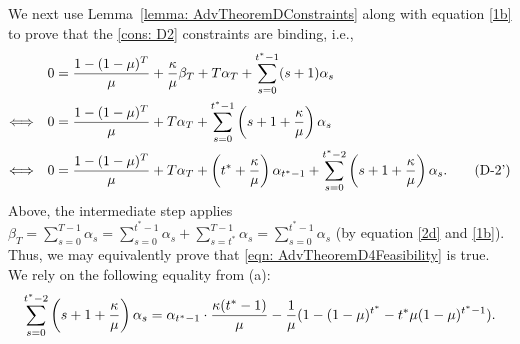     {We next use Lemma~\ref{lemma: AdvTheoremDConstraints} along with equation \eqref{1b} to prove that the \ref{cons: D2} constraints are binding, i.e.,}
    \begin{align*}
        && 0 &= \frac{1- (1-\mu)^T}{\mu} + \frac{\kappa}{\mu} \beta_T + T \alpha_T + \sum_{s=0}^{t^*-1} (s+1) \alpha_s\\
        \Longleftrightarrow && 0 &= \frac{1- (1-\mu)^T}{\mu} + T\alpha_T + \sum_{s=0}^{t^*-1} \left(s+1+\frac{\kappa}{\mu} \right) \alpha_s\\
        \Longleftrightarrow && 0 &= \frac{1- (1-\mu)^T}{\mu} + T\alpha_T + \left(t^* + \frac{\kappa}{\mu} \right) \alpha_{t^*-1} + \sum_{s=0}^{t^*-2} \left(s+1+\frac{\kappa}{\mu} \right) \alpha_s. \tag{D-2'} \label{eqn: AdvTheoremD4Feasibility}
    \end{align*}
    Above, the intermediate step applies $\beta_T=\sum_{s=0}^{T-1} \alpha_s=\sum_{s=0}^{t^*-1}\alpha_s+\sum_{s=t^*}^{T-1}\alpha_s=\sum_{s=0}^{t^*-1}\alpha_s$ (by equation \eqref{2d} and \eqref{1b}). Thus, we may equivalently prove that \ref{eqn: AdvTheoremD4Feasibility} is true.
    We rely on the following equality from  (a):
    \begin{equation*}
            \sum_{s=0}^{t^*-2} \left(s+1+\frac{\kappa}{\mu} \right) \alpha_s= \alpha_{t^*-1} \cdot \frac{\kappa(t^*-1)}{\mu} - \frac{1}{\mu} (1 - (1-\mu)^{t^*} - t^* \mu (1-\mu)^{t^*-1}).
    \end{equation*}

